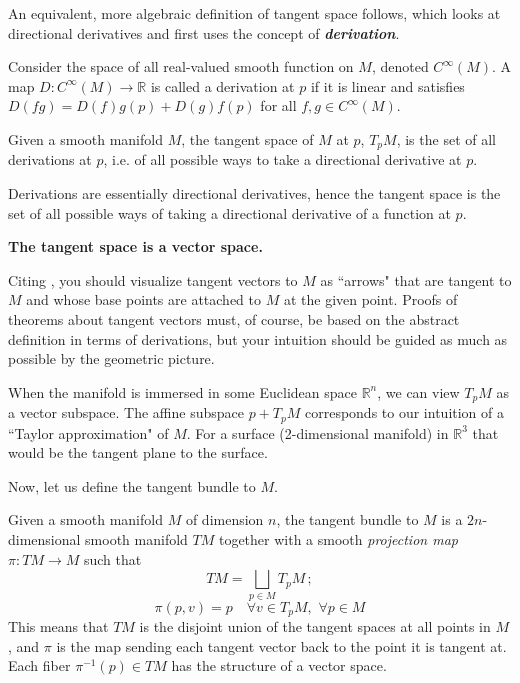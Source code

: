 \documentclass[a4paper,12pt,reqno]{amsbook}
\theoremstyle{definition} %
\newcommand{\1}{\mathbbm{1}}
\theoremstyle{plain}
\theoremstyle{remark}
\begin{document}
An equivalent, more algebraic definition of tangent space follows, which looks at directional derivatives and first uses the concept of \textbf{\emph{derivation}}.
\begin{definition}[Derivation]\label{def: deriv}
     Consider the space of all real-valued smooth function on $M$, denoted $C^\infty(M)$. A map $D: C^\infty (M) \to \mathbb{R}$ is called a derivation at $p$ if it is linear and satisfies $D(fg) = D(f) g(p) + D(g) f(p)$ for all $f,g \in C^\infty(M)$. 
\end{definition}
\begin{definition}
    Given a smooth manifold $M$, the tangent space of $M$ at $p$, $T_pM$, is the set of all derivations at $p$, i.e. of all possible ways to take a directional derivative at $p$.
\end{definition}

\begin{remark}
    Derivations are essentially directional derivatives, hence the tangent space is the set of all possible ways of taking a directional derivative of a function at $p$. 
\end{remark}

\begin{remark}
    \textbf{The tangent space is a vector space.}
\end{remark}
Citing \cite{lee2003smooth}, you should
visualize tangent vectors to $M$ as ``arrows" that are tangent to $M$ and whose base
points are attached to $M$ at the given point. Proofs of theorems about tangent vectors
must, of course, be based on the abstract definition in terms of derivations, but your
intuition should be guided as much as possible by the geometric picture.

When the manifold is immersed in some Euclidean space $\mathbb{R}^n$, we can view $T_pM$ as a vector subspace. The affine subspace $p+T_pM$ corresponds to our intuition of a ``Taylor approximation" of $M$. For a surface (2-dimensional manifold) in $\mathbb{R}^3$ that would be the tangent plane to the surface. 



Now, let us define the tangent bundle to $M$. 

\begin{definition}
    Given a smooth manifold $M$ of dimension $n$, the tangent bundle to $M$ is a $2n$-dimensional smooth
manifold $TM$ together with a smooth \emph{projection map}  $\pi:TM \to M$ such that 
\[
        TM = \bigsqcup_{p \in M} T_pM\,;\]\[
    \pi(p,v)=p \quad\forall v \in T_pM, \,\, \forall p \in M
\]
   This means that $TM$ is the disjoint union of the tangent spaces at all points in $M$, and $\pi$ is the map sending each tangent vector back to the point it is tangent at. Each fiber $\pi^{-1}(p) \in TM$ has the structure of a vector space.   
\end{definition}
\end{document}
